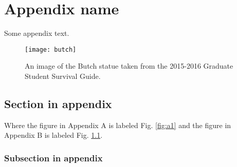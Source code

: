 \chapter{Appendix name}

Some appendix text.
\begin{figure}[H] %
    \centering
    \texttt{[image: butch]}
    \caption{An image of the Butch statue taken from the 2015-2016 Graduate Student Survival Guide.}
    \label{fig:b1}
\end{figure}

\section{Section in appendix}
Where the figure in Appendix A is labeled Fig. \ref{fig:a1} and the figure in Appendix B is labeled Fig. \ref{fig:b1}. 
\subsection{Subsection in appendix} 